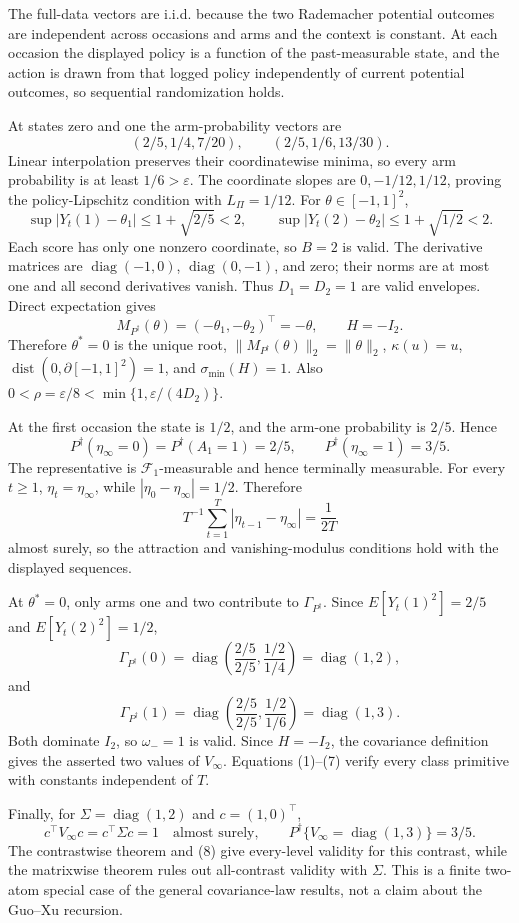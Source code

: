 The full-data vectors are i.i.d. because the two Rademacher potential outcomes are independent across occasions and arms and the context is constant. At each occasion the displayed policy is a function of the past-measurable state, and the action is drawn from that logged policy independently of current potential outcomes, so sequential randomization holds.

At states zero and one the arm-probability vectors are
\[
 (2/5,1/4,7/20),\qquad(2/5,1/6,13/30). \tag{1}
\]
Linear interpolation preserves their coordinatewise minima, so every arm probability is at least \(1/6>\varepsilon\). The coordinate slopes are \(0,-1/12,1/12\), proving the policy-Lipschitz condition with \(L_\Pi=1/12\). For \(\theta\in[-1,1]^2\),
\[
 \sup|Y_t(1)-\theta_1|\le1+\sqrt{2/5}<2,
 \qquad \sup|Y_t(2)-\theta_2|\le1+\sqrt{1/2}<2. \tag{2}
\]
Each score has only one nonzero coordinate, so \(B=2\) is valid. The derivative matrices are \(\operatorname{diag}(-1,0)\), \(\operatorname{diag}(0,-1)\), and zero; their norms are at most one and all second derivatives vanish. Thus \(D_1=D_2=1\) are valid envelopes. Direct expectation gives
\[
 M_{P^\dagger}(\theta)=(-\theta_1,-\theta_2)^\top=-\theta,
 \qquad H=-I_2. \tag{3}
\]
Therefore \(\theta^*=0\) is the unique root, \(\|M_{P^\dagger}(\theta)\|_2=\|\theta\|_2\), \(\kappa(u)=u\), \(\operatorname{dist}(0,\partial[-1,1]^2)=1\), and \(\sigma_{\min}(H)=1\). Also \(0<\rho=\varepsilon/8<\min\{1,\varepsilon/(4D_2)\}\).

At the first occasion the state is \(1/2\), and the arm-one probability is \(2/5\). Hence
\[
 P^\dagger(\eta_\infty=0)=P^\dagger(A_1=1)=2/5,
 \qquad P^\dagger(\eta_\infty=1)=3/5. \tag{4}
\]
The representative is \(\mathcal F_1\)-measurable and hence terminally measurable. For every \(t\ge1\), \(\eta_t=\eta_\infty\), while \(|\eta_0-\eta_\infty|=1/2\). Therefore
\[
 T^{-1}\sum_{t=1}^T|\eta_{t-1}-\eta_\infty|=\frac1{2T} \tag{5}
\]
almost surely, so the attraction and vanishing-modulus conditions hold with the displayed sequences.

At \(\theta^*=0\), only arms one and two contribute to \(\Gamma_{P^\dagger}\). Since \(E[Y_t(1)^2]=2/5\) and \(E[Y_t(2)^2]=1/2\),
\[
 \Gamma_{P^\dagger}(0)=\operatorname{diag}\left(\frac{2/5}{2/5},\frac{1/2}{1/4}\right)
 =\operatorname{diag}(1,2), \tag{6}
\]
and
\[
 \Gamma_{P^\dagger}(1)=\operatorname{diag}\left(\frac{2/5}{2/5},\frac{1/2}{1/6}\right)
 =\operatorname{diag}(1,3). \tag{7}
\]
Both dominate \(I_2\), so \(\omega_-=1\) is valid. Since \(H=-I_2\), the covariance definition gives the asserted two values of \(V_\infty\). Equations (1)--(7) verify every class primitive with constants independent of \(T\).

Finally, for \(\Sigma=\operatorname{diag}(1,2)\) and \(c=(1,0)^\top\),
\[
 c^\top V_\infty c=c^\top\Sigma c=1\quad\text{almost surely},
 \qquad P^\dagger\{V_\infty=\operatorname{diag}(1,3)\}=3/5. \tag{8}
\]
The contrastwise theorem and (8) give every-level validity for this contrast, while the matrixwise theorem rules out all-contrast validity with \(\Sigma\). This is a finite two-atom special case of the general covariance-law results, not a claim about the Guo--Xu recursion.